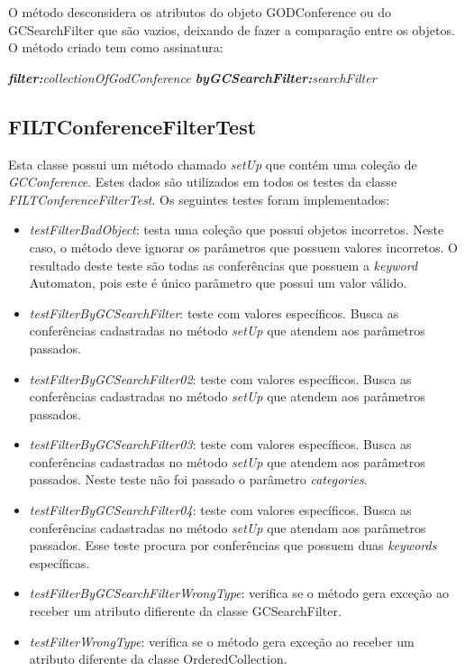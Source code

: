 O método desconsidera os atributos do objeto GODConference ou do GCSearchFilter que são vazios, deixando de fazer a comparação entre os objetos.\\

O método criado tem como assinatura:

\textit{\textbf{filter:}collectionOfGodConference \textbf{byGCSearchFilter:}searchFilter}

\subsection{FILTConferenceFilterTest}

Esta classe possui um método chamado \textit{setUp} que contém uma coleção de \textit{GCConference}. Estes dados são utilizados em todos os testes da classe \textit{FILTConferenceFilterTest}. Os seguintes testes foram implementados:

\begin{itemize}
\item \textit{testFilterBadObject}: testa uma coleção que possui objetos incorretos. Neste caso, o método deve ignorar os parâmetros que possuem valores incorretos. O resultado deste teste são todas as conferências que possuem a \textit{keyword} Automaton, pois este é único parâmetro que possui um valor válido.
\item \textit{testFilterByGCSearchFilter}: teste com valores específicos. Busca as conferências cadastradas no método \textit{setUp} que atendem aos parâmetros passados.
\item \textit{testFilterByGCSearchFilter02}: teste com valores específicos. Busca as conferências cadastradas no método \textit{setUp} que atendem aos parâmetros passados.
\item \textit{testFilterByGCSearchFilter03}: teste com valores específicos. Busca as conferências cadastradas no método \textit{setUp} que atendem aos parâmetros passados. Neste teste não foi passado o parâmetro \textit{categories}.
\item \textit{testFilterByGCSearchFilter04}: teste com valores específicos. Busca as conferências cadastradas no método \textit{setUp} que atendam aos parâmetros passados. Esse teste procura por conferências que possuem duas \textit{keywords} específicas.
\item \textit{testFilterByGCSearchFilterWrongType}: verifica se o método gera exceção ao receber um atributo difierente da classe GCSearchFilter.
\item \textit{testFilterWrongType}: verifica se o método gera exceção ao receber um atributo diferente da classe OrderedCollection.
\end{itemize}